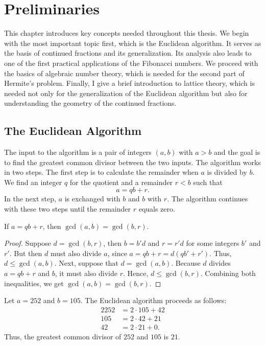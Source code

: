 \chapter{Preliminaries}
\label{ch:preliminaries}

This chapter introduces key concepts needed throughout this thesis.
We begin with the most important topic first,
which is the Euclidean algorithm.
It serves as the basis of continued fractions and its generalization.
Its analysis also leads to one of the first practical applications
of the Fibonacci numbers.
We proceed with the basics of algebraic number theory,
which is needed for the second part of Hermite's problem.
Finally, I give a brief introduction to lattice theory,
which is needed not only for the generalization of the Euclidean algorithm
but also for understanding the geometry of the continued fractions.

\section{The Euclidean Algorithm}

The input to the algorithm is a pair of integers $(a, b)$ with $a > b$ and the
goal is to find the greatest common divisor between the two inputs.
The algorithm works in two steps.
The first step is to calculate the remainder when $a$ is divided by $b$.
We find an integer $q$ for the quotient and a remainder $r < b$ such that
\[
  a = q b + r.
\]
In the next step, $a$ is exchanged with $b$ and $b$ with $r$.
The algorithm continues with these two steps until the remainder $r$ equals zero.

\begin{lemma}
  If $a = qb + r$, then $\gcd(a, b) = \gcd(b, r)$.
\end{lemma}

\begin{proof}
  Suppose $d = \gcd(b, r)$, then $b = b'd$ and $r = r'd$ for some integers $b'$ and $r'$.
  But then $d$ must also divide $a$, since $a = qb + r = d(qb' + r')$.
  Thus, $d ≤ \gcd(a, b)$.
  Next, suppose that $d = \gcd(a, b)$.
  Because $d$ divides $a = qb + r$ and $b$,
  it must also divide $r$.
  Hence, $d ≤ \gcd(b, r)$.
  Combining both inequalities, we get $\gcd(a, b) = \gcd(b, r)$.
\end{proof}

\begin{example}
  Let $a = 252$ and $b = 105$.
  The Euclidean algorithm proceeds as follows:
  \begin{alignat*}{2}
    252 & = 2 · 105 + 42 \\
    105 & = 2 · 42 + 21 \\
    42 & = 2 · 21 + 0.
  \end{alignat*}
  Thus, the greatest common divisor of $252$ and $105$ is $21$.
\end{example}

